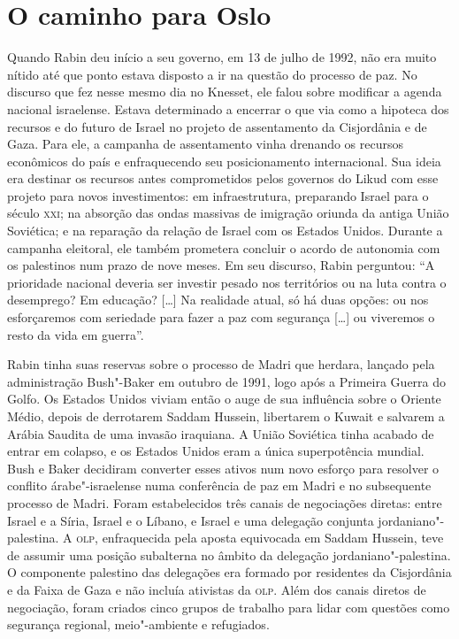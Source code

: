 \section{O caminho para Oslo}

Quando Rabin deu início a seu governo, em 13 de julho de 1992, não
era muito nítido até que ponto estava disposto a ir na questão do processo
de paz. No discurso que fez nesse mesmo dia no Knesset, ele falou sobre
modificar a agenda nacional israelense. Estava determinado a encerrar o
que via como a hipoteca dos recursos e do futuro de Israel no projeto de
assentamento da Cisjordânia e de Gaza. Para ele, a campanha de
assentamento vinha drenando os recursos econômicos do país e
enfraquecendo seu posicionamento internacional. Sua ideia era destinar
os recursos antes comprometidos pelos governos do Likud com esse projeto
para novos investimentos: em infraestrutura, preparando Israel para o
século \textsc{xxi}; na absorção das ondas massivas de imigração oriunda da
antiga União Soviética; e na reparação da relação de Israel com os
Estados Unidos. Durante a campanha eleitoral, ele também prometera
concluir o acordo de autonomia com os palestinos num prazo de nove
meses. Em seu discurso, Rabin perguntou: ``A prioridade nacional deveria
ser investir pesado nos territórios ou na luta contra o desemprego? Em
educação? {[}\ldots{}{]} Na realidade atual, só há duas opções: ou nos esforçaremos
com seriedade para fazer a paz com segurança {[}\ldots{}{]} ou viveremos o resto da
vida em guerra''.

Rabin tinha suas reservas sobre o processo de Madri que herdara, lançado
pela administração Bush"-Baker em outubro de 1991, logo após a Primeira
Guerra do Golfo. Os Estados Unidos viviam então o auge de sua influência
sobre o Oriente Médio, depois de derrotarem Saddam Hussein, libertarem o
Kuwait e salvarem a Arábia Saudita de uma invasão iraquiana. A União
Soviética tinha acabado de entrar em colapso, e os Estados Unidos eram a
única superpotência mundial. Bush e Baker decidiram converter esses
ativos num novo esforço para resolver o conflito árabe"-israelense numa
conferência de paz em Madri e no subsequente processo de Madri. Foram
estabelecidos três canais de negociações diretas: entre Israel e a
Síria, Israel e o Líbano, e Israel e uma delegação conjunta
jordaniano"-palestina. A \textsc{olp}, enfraquecida pela aposta equivocada em
Saddam Hussein, teve de assumir uma posição subalterna no âmbito da
delegação jordaniano"-palestina. O componente palestino das delegações
era formado por residentes da Cisjordânia e da Faixa de Gaza e não
incluía ativistas da \textsc{olp}. Além dos canais diretos de negociação, foram
criados cinco grupos de trabalho para lidar com questões como segurança
regional, meio"-ambiente e refugiados.


